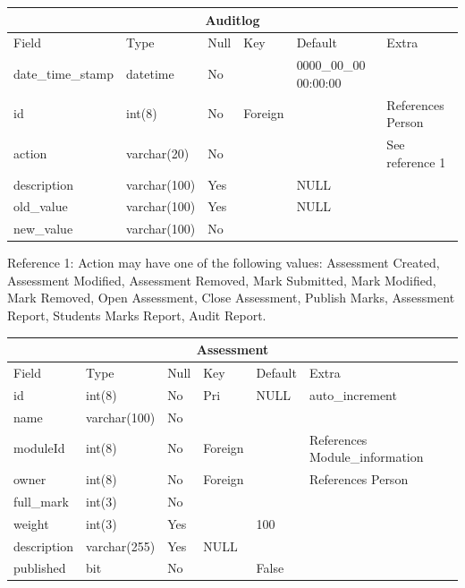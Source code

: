 \begin{table}[ht]
\begin{tabular}[c]{|l|l|l|l|l|l|}
  \hline
  \multicolumn{6}{|c|}{Auditlog} \\
  \hline 
  Field & Type & Null & Key & Default & Extra \\ [0.5ex] %
  \hline
  date\_time\_stamp & datetime & No & & 0000\_00\_00 00:00:00 & \\
  id & int(8) & No & Foreign & & References Person \\
  action & varchar(20) & No & & & See reference 1 \\
  description & varchar(100) & Yes & & NULL & \\
  old\_value & varchar(100) & Yes & & NULL & \\
  new\_value & varchar(100) & No & & & \\
  \hline
\end{tabular}
\end{table} 

\newpage
{Reference 1: Action may have one of the following values: Assessment Created, Assessment Modified, Assessment Removed, Mark Submitted, Mark Modified, Mark Removed, Open Assessment, Close Assessment, Publish Marks, Assessment Report, Students Marks Report, Audit Report.}

\begin{table}[ht]
\begin{tabular}[c]{|l|l|l|l|l|l|}
  \hline
  \multicolumn{6}{|c|}{Assessment} \\
  \hline 
  Field & Type & Null & Key & Default & Extra \\ [0.5ex] %
  \hline
  id & int(8) & No & Pri & NULL & auto\_increment \\
  name & varchar(100) & No & & & \\
  moduleId & int(8) & No & Foreign & & References Module\_information \\
  owner & int(8) & No & Foreign & & References Person \\
  full\_mark & int(3) & No & & & \\
  weight & int(3) & Yes & & 100 & \\
  description & varchar(255) & Yes & NULL & & \\
  published & bit & No & & False & \\
  \hline
\end{tabular}
\end{table} 


